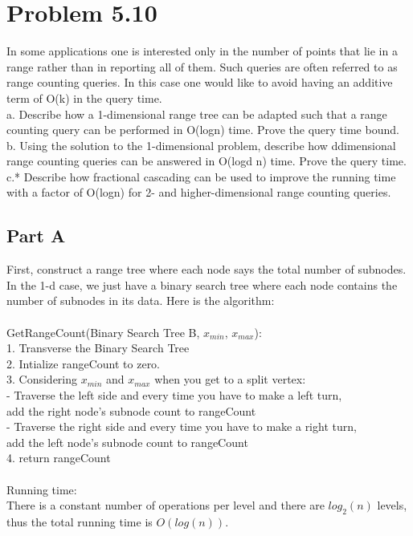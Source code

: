 \documentclass[11pt,psfig]{article}
\begin{document}
\newpage

\section*{Problem 5.10}
 
In some applications one is interested only in the number of points that
lie in a range rather than in reporting all of them. Such queries are often
referred to as range counting queries. In this case one would like to avoid
having an additive term of O(k) in the query time.\\
a. Describe how a 1-dimensional range tree can be adapted such that a
range counting query can be performed in O(logn) time. Prove the
query time bound.\\
b. Using the solution to the 1-dimensional problem, describe how ddimensional
range counting queries can be answered in O(logd n)
time. Prove the query time.\\
c.* Describe how fractional cascading can be used to improve the running
time with a factor of O(logn) for 2- and higher-dimensional range
counting queries.\\

\subsection*{Part A}

First, construct a range tree where each node says the total number of subnodes. 
\\
In the 1-d case, we just have a binary search tree where each node contains the number of subnodes in its data. Here is the algorithm:\\
\\
GetRangeCount(Binary Search Tree B, $x_{min}$, $x_{max}$):\\
1. Transverse the Binary Search Tree\\
2. Intialize rangeCount to zero. \\
3. Considering $x_{min}$ and $x_{max}$ when you get to a split vertex:\\
- Traverse the left side and every time you have to make a left turn, \\
add the right node's subnode count to rangeCount \\
- Traverse the right side and every time you have to make a right turn, \\
add the left node's subnode count to rangeCount \\
4. return rangeCount\\
\\
Running time:\\
There is a constant number of operations per level and there are $log_2(n)$ levels, thus the total running time is $O(log(n))$. \\
\\
\newpage
\end{document}
